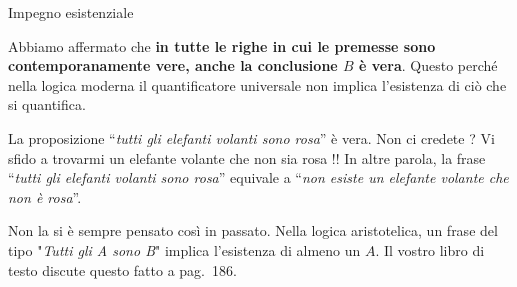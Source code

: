\documentclass[aspectratio=169,10pt,dvipsnames,xcolor=table]{beamer}
\begin{document}
\begin{frame}{Impegno esistenziale}
    \medskip

    \medskip
    Abbiamo affermato che \textbf{in tutte le righe in cui le premesse sono contemporanamente vere, anche la conclusione $B$ è vera}. Questo perché nella logica moderna il quantificatore universale non implica l'esistenza di ciò che si quantifica.

    \medskip
    La proposizione ``\emph{tutti gli elefanti volanti sono rosa}'' è vera. Non ci credete ? Vi sfido a trovarmi un elefante volante che non sia rosa !! In altre parola, la frase ``\emph{tutti gli elefanti volanti sono rosa}'' equivale a ``\emph{non esiste un elefante volante che non è rosa}''.


    \medskip
    Non la si è sempre pensato così in passato. Nella logica aristotelica, un frase del tipo "\emph{Tutti gli A sono B}" implica l'esistenza di almeno un $A$. Il vostro libro di testo discute questo fatto a pag.~186.
\end{frame}
\end{document}
